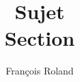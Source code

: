 \documentclass[12pt,a4paper,french,toc=bib,oneside,version=3.41]{scrartcl}
\title{Sujet \\ Section} %
\author{François Roland}
\begin{document}
\onehalfspacing{}


\end{document}
